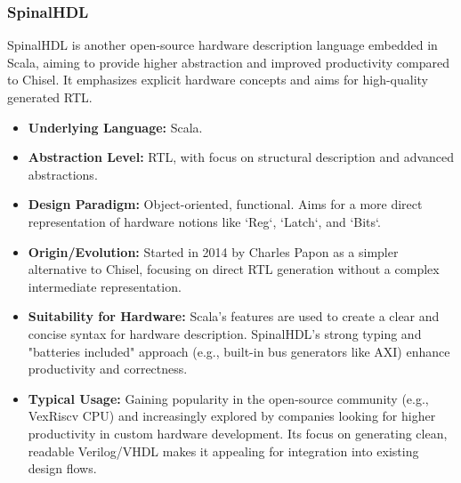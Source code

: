 \documentclass[sigconf, anonymous=false]{acmart} %
\begin{document}
\subsubsection{SpinalHDL}
SpinalHDL\cite{SpinalHDLDocs} is another open-source hardware description language embedded in Scala, aiming to provide higher abstraction and improved productivity compared to Chisel. It emphasizes explicit hardware concepts and aims for high-quality generated RTL.
\begin{itemize}
    \item \textbf{Underlying Language:} Scala.
    \item \textbf{Abstraction Level:} RTL, with focus on structural description and advanced abstractions.
    \item \textbf{Design Paradigm:} Object-oriented, functional. Aims for a more direct representation of hardware notions like `Reg`, `Latch`, and `Bits`.
    \item \textbf{Origin/Evolution:} Started in 2014 by Charles Papon as a simpler alternative to Chisel, focusing on direct RTL generation without a complex intermediate representation.
    \item \textbf{Suitability for Hardware:} Scala's features are used to create a clear and concise syntax for hardware description. SpinalHDL's strong typing and "batteries included" approach (e.g., built-in bus generators like AXI) enhance productivity and correctness.
    \item \textbf{Typical Usage:} Gaining popularity in the open-source community (e.g., VexRiscv CPU) and increasingly explored by companies looking for higher productivity in custom hardware development. Its focus on generating clean, readable Verilog/VHDL makes it appealing for integration into existing design flows.
\end{itemize}
\end{document}
